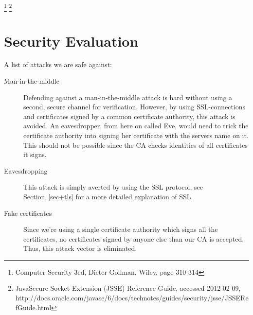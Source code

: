 \documentclass[10pt, a4paper]{article}
\begin{document}
\footnote{Computer Security 3ed, Dieter Gollman, Wiley, page 310-314}
\footnote{Java\textregistered Secure Socket Extension (JSSE) Reference Guide, accessed 2012-02-09, http://docs.oracle.com/javase/6/docs/technotes/guides/security/jsse/JSSERefGuide.html}


\section{Security Evaluation}
A list of attacks we are safe against:
\begin{description}
\item[Man-in-the-middle] Defending against a man-in-the-middle attack is hard without using a second, secure channel for verification. However, by using SSL-connections and certificates signed by a common certificate authority, this attack is avoided. An eavesdropper, from here on called Eve, would need to trick the certificate authority into signing her certificate with the servers name on it. This should not be possible since the CA checks identities of all certificates it signs.
\item[Eavesdropping] This attack is simply averted by using the SSL protocol, see Section~\ref{sec+tls} for a more detailed explanation of SSL.
\item[Fake certificates] Since we're using a single certificate authority which signs all the certificates, no certificates signed by anyone else than our CA is accepted. Thus, this attack vector is eliminated.
\end{description}
\end{document}
